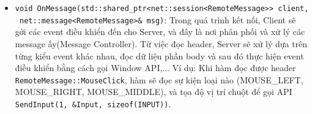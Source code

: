 \begin{itemize}
\begin{itemize}
		\item[] \lstinline{void OnMessage(std::shared_ptr<net::session<RemoteMessage>> client,}\\ \lstinline{ net::message<RemoteMessage>& msg)}: Trong quá trình kết nối, Client sẽ gởi các event điều khiển đến cho Server, và đây là nơi phân phối và xử lý các message ấy(Message Controller). Từ việc đọc header, Server sẽ xử lý dựa trên từng kiểu event khác nhau, đọc dữ liệu phần body và sau đó thực hiện event điều khiển bằng cách gọi Window API,... Ví dụ: Khi hàm đọc được header \lstinline{RemoteMessage::MouseClick}, hàm sẽ đọc sự kiện loại nào (MOUSE\_LEFT, MOUSE\_RIGHT, MOUSE\_MIDDLE), và tọa độ vị trí chuột để gọi API \lstinline{SendInput(1, &Input, sizeof(INPUT))}.
	\end{itemize}
\end{itemize}

